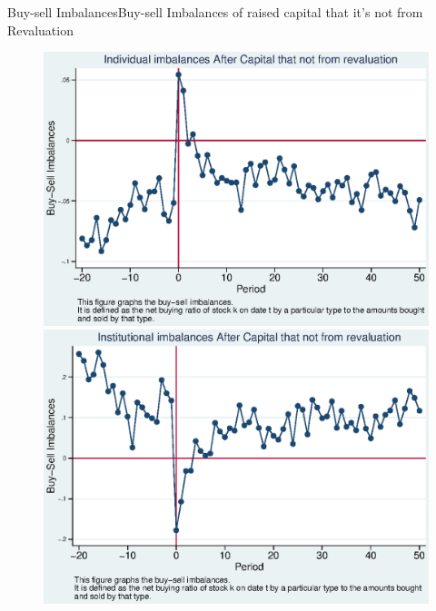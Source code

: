 \documentclass{beamer}
\begin{document}
\begin{frame}{Buy-sell Imbalances}{Buy-sell Imbalances of raised capital that it's not from Revaluation}
\begin{figure}
\centering
\includegraphics[width=0.45\linewidth]{Output/IndImb_NoRevaluation.eps}
\includegraphics[width=0.45\linewidth]{Output/InsImb_NoRevaluation.eps}
\label{fig:indimbnorevaluation}
\end{figure}
\end{frame}
\end{document}

